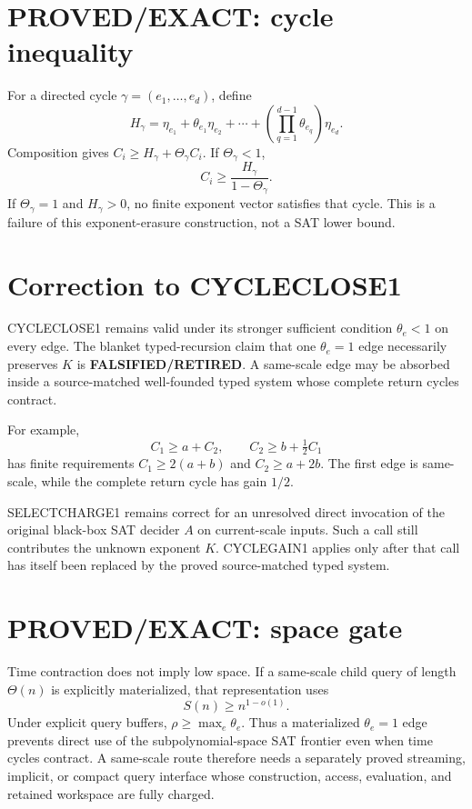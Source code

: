 \documentclass[11pt]{article}
\begin{document}
\section*{PROVED/EXACT: cycle inequality}
For a directed cycle \(\gamma=(e_1,\ldots,e_d)\), define
\[
H_\gamma=\eta_{e_1}+\theta_{e_1}\eta_{e_2}+\cdots+
\left(\prod_{q=1}^{d-1}\theta_{e_q}\right)\eta_{e_d}.
\]
Composition gives \(C_i\ge H_\gamma+\Theta_\gamma C_i\). If \(\Theta_\gamma<1\),
\[
\boxed{C_i\ge\frac{H_\gamma}{1-\Theta_\gamma}}.
\]
If \(\Theta_\gamma=1\) and \(H_\gamma>0\), no finite exponent vector satisfies that cycle. This is a failure of this exponent-erasure construction, not a SAT lower bound.

\section*{Correction to CYCLECLOSE1}
CYCLECLOSE1 remains valid under its stronger sufficient condition \(\theta_e<1\) on every edge. The blanket typed-recursion claim that one \(\theta_e=1\) edge necessarily preserves \(K\) is \textbf{FALSIFIED/RETIRED}. A same-scale edge may be absorbed inside a source-matched well-founded typed system whose complete return cycles contract.

For example,
\[
C_1\ge a+C_2,\qquad C_2\ge b+\tfrac12 C_1
\]
has finite requirements \(C_1\ge2(a+b)\) and \(C_2\ge a+2b\). The first edge is same-scale, while the complete return cycle has gain \(1/2\).

SELECTCHARGE1 remains correct for an unresolved direct invocation of the original black-box SAT decider \(A\) on current-scale inputs. Such a call still contributes the unknown exponent \(K\). CYCLEGAIN1 applies only after that call has itself been replaced by the proved source-matched typed system.

\section*{PROVED/EXACT: space gate}
Time contraction does not imply low space. If a same-scale child query of length \(\Theta(n)\) is explicitly materialized, that representation uses
\[
\boxed{S(n)\ge n^{1-o(1)}}.
\]
Under explicit query buffers, \(\rho\ge\max_e\theta_e\). Thus a materialized \(\theta_e=1\) edge prevents direct use of the subpolynomial-space SAT frontier even when time cycles contract. A same-scale route therefore needs a separately proved streaming, implicit, or compact query interface whose construction, access, evaluation, and retained workspace are fully charged.
\end{document}
